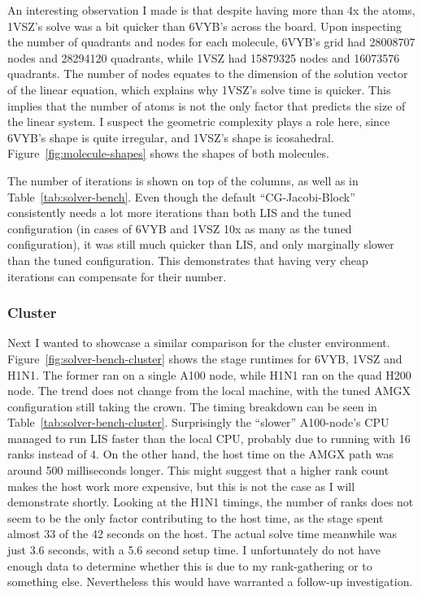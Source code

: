 


An interesting observation I made is that despite having more than 4x the atoms, 1VSZ's solve was a bit quicker than 6VYB's across the board.
Upon inspecting the number of quadrants and nodes for each molecule, 6VYB's grid had 28008707 nodes and 28294120 quadrants, while 1VSZ had 15879325 nodes and 16073576 quadrants.
The number of nodes equates to the dimension of the solution vector of the linear equation, which explains why 1VSZ's solve time is quicker.
This implies that the number of atoms is not the only factor that predicts the size of the linear system.
I suspect the geometric complexity plays a role here, since 6VYB's shape is quite irregular, and 1VSZ's shape is icosahedral.
Figure~\ref{fig:molecule-shapes} shows the shapes of both molecules.



The number of iterations is shown on top of the columns, as well as in Table~\ref{tab:solver-bench}.
Even though the default ``CG-Jacobi-Block'' consistently needs a lot more iterations than both LIS and the tuned configuration (in cases of 6VYB and 1VSZ 10x as many as the tuned configuration), it was still much quicker than LIS, and only marginally slower than the tuned configuration.
This demonstrates that having very cheap iterations can compensate for their number.

\subsubsection{Cluster}

Next I wanted to showcase a similar comparison for the cluster environment.
Figure~\ref{fig:solver-bench-cluster} shows the stage runtimes for 6VYB, 1VSZ and H1N1.
The former ran on a single A100 node, while H1N1 ran on the quad H200 node.
The trend does not change from the local machine, with the tuned AMGX configuration still taking the crown.
The timing breakdown can be seen in Table~\ref{tab:solver-bench-cluster}.
Surprisingly the ``slower'' A100-node's CPU managed to run LIS faster than the local CPU, probably due to running with 16 ranks instead of 4.
On the other hand, the host time on the AMGX path was around 500 milliseconds longer.
This might suggest that a higher rank count makes the host work more expensive, but this is not the case as I will demonstrate shortly.
Looking at the H1N1 timings, the number of ranks does not seem to be the only factor contributing to the host time, as the stage spent almost 33 of the 42 seconds on the host.
The actual solve time meanwhile was just 3.6 seconds, with a 5.6 second setup time.
I unfortunately do not have enough data to determine whether this is due to my rank-gathering or to something else.
Nevertheless this would have warranted a follow-up investigation.

